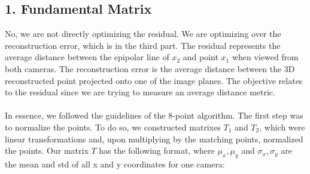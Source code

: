 \documentclass{article}\usepackage{amsmath,amssymb,amsthm,tikz,tkz-graph,color,chngpage,soul,hyperref,csquotes,graphicx,floatrow}\newcommand*{\QEDB}{\hfill\ensuremath{\square}}\newtheorem*{prop}{Proposition}\renewcommand{\theenumi}{\alph{enumi}}\usepackage[shortlabels]{enumitem}\usepackage[nobreak=true]{mdframed}\usetikzlibrary{matrix,calc}\MakeOuterQuote{"}\usepackage[margin=0.95in]{geometry} \newtheorem{theorem}{Theorem}
\begin{document}
\subsection*{1. Fundamental Matrix}
\begin{mdframed}
No, we are not directly optimizing the residual. We are optimizing over the reconstruction error, which is in the third part. The residual represents the average distance between the epipolar line of $ x_2$ and point $ x_1 $ when viewed from both cameras. The reconstruction error is the average distance between the 3D reconstructed point projected onto one of the image planes. The objective relates to the residual since we are trying to measure an average distance metric.  
\\\\In essence, we followed the guidelines of the 8-point algorithm. The first step was to normalize the points. To do so, we constructed matrixes $ T_1 $ and $ T_2 $, which were linear transformations and, upon multiplying by the matching points, normalized the points. Our matrix $ T $ has the following format, where $ \mu_x, \mu_y $ and $ \sigma_x, \sigma_y $ are the mean and std of all x and y coordinates for one camera:


\end{mdframed}
\end{document}
